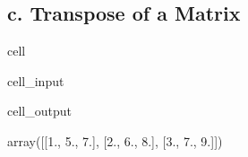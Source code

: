 \documentclass[letterpaper,10pt,english]{jupyterBook}
\begin{document}
\subsection{c. Transpose of a Matrix}
\label{\detokenize{lessons/Intro_to_Matrices_in_NumPy:c-transpose-of-a-matrix}}
\begin{sphinxuseclass}{cell}\begin{sphinxVerbatimInput}

\begin{sphinxuseclass}{cell_input}
\begin{sphinxVerbatim}[commandchars=\\\{\}]
  
\end{sphinxVerbatim}

\end{sphinxuseclass}\end{sphinxVerbatimInput}
\begin{sphinxVerbatimOutput}

\begin{sphinxuseclass}{cell_output}
\begin{sphinxVerbatim}[commandchars=\\\{\}]
array([[1., 5., 7.],
       [2., 6., 8.],
       [3., 7., 9.]])
\end{sphinxVerbatim}

\end{sphinxuseclass}\end{sphinxVerbatimOutput}

\end{sphinxuseclass}
\end{document}
